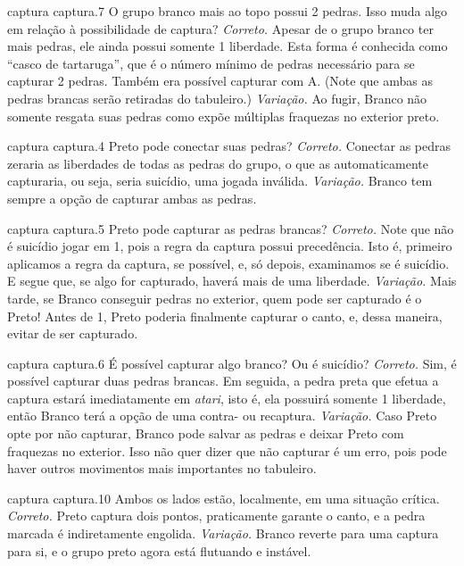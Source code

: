 \problemAnswerDiagram
  {captura}
  {captura.7}
  {O grupo branco mais ao topo possui 2 pedras. Isso muda algo em relação à possibilidade de captura?}
  {\emph{Correto.} Apesar de o grupo branco ter mais pedras, ele ainda possui somente 1 liberdade. Esta forma é conhecida como ``casco de tartaruga'', que é o número mínimo de pedras necessário para se capturar 2 pedras. Também era possível capturar com A. (Note que ambas as pedras brancas serão retiradas do tabuleiro.)}
  {\emph{Variação.} Ao fugir, Branco não somente resgata suas pedras como expõe múltiplas fraquezas no exterior preto.}

\problemAnswerDiagram
  {captura}
  {captura.4}
  {Preto pode conectar suas pedras?}
  {\emph{Correto.} Conectar as pedras zeraria as liberdades de todas as pedras do grupo, o que as automaticamente capturaria, ou seja, seria suicídio, uma jogada inválida.}
  {\emph{Variação.} Branco tem sempre a opção de capturar ambas as pedras.}

\problemAnswerDiagram
  {captura}
  {captura.5}
  {Preto pode capturar as pedras brancas?}
  {\emph{Correto.} Note que não é suicídio jogar em 1, pois a regra da captura possui precedência. Isto é, primeiro aplicamos a regra da captura, se possível, e, só depois, examinamos se é suicídio. E segue que, se algo for capturado, haverá mais de uma liberdade.}
  {\emph{Variação.} Mais tarde, se Branco conseguir pedras no exterior, quem pode ser capturado é o Preto! Antes de 1, Preto poderia finalmente capturar o canto, e, dessa maneira, evitar de ser capturado.}

\problemAnswerDiagram
  {captura}
  {captura.6}
  {É possível capturar algo branco? Ou é suicídio?}
  {\emph{Correto.} Sim, é possível capturar duas pedras brancas. Em seguida, a pedra preta que efetua a captura estará imediatamente em \emph{atari}, isto é, ela possuirá somente 1 liberdade, então Branco terá a opção de uma contra- ou recaptura.}
  {\emph{Variação.} Caso Preto opte por não capturar, Branco pode salvar as pedras e deixar Preto com fraquezas no exterior. Isso não quer dizer que não capturar é um erro, pois pode haver outros movimentos mais importantes no tabuleiro.}

\problemAnswerDiagram
  {captura}
  {captura.10}
  {Ambos os lados estão, localmente, em uma situação crítica.}
  {\emph{Correto.} Preto captura dois pontos, praticamente garante o canto, e a pedra marcada é indiretamente engolida.}
  {\emph{Variação.} Branco reverte para uma captura para si, e o grupo preto agora está flutuando e instável.}

